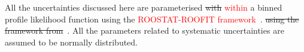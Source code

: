 All the uncertainties discussed here are parameterised 
\sout{with}  \textcolor{red}{within} 
a binned profile likelihood function using the \textcolor{red}{ROOSTAT-ROOFIT framework}~\cite{roostat,roofit}.
\sout{using the framework from}~\cite{roostat,roofit}.
All the parameters related to systematic uncertainties are assumed to be normally distributed.


















